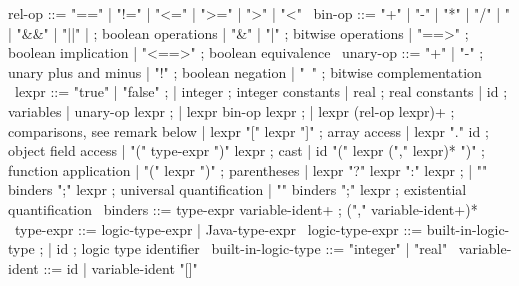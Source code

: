 \begin{syntax}
  rel-op ::= "==" | "!=" | "<=" | ">=" | ">" | "<"
       \
  bin-op ::= "+" | "-" | "*" | "/" | "%
       | "&&" | "||" |   ; boolean operations
       | "&" | "|" ; bitwise operations
       | "==>" ; boolean implication
       | "<==>" ; boolean equivalence
       \
  unary-op ::= "+" | "-" ; unary plus and minus
       | "!" ; boolean negation
       | "~" ;  bitwise complementation
       \
  lexpr ::= "true" | "false" ;
       | integer ; integer constants
       | real ; real constants
       | id ; variables
       | unary-op lexpr ;
       | lexpr bin-op lexpr ;
       | lexpr (rel-op lexpr)+ ; comparisons, see remark below
       | lexpr "[" lexpr "]" ; array access
       | lexpr "." id  ; object field access
       | "(" type-expr ")" lexpr  ; cast
       | id "(" lexpr ("," lexpr)* ")" ; function application
       | "(" lexpr ")" ; parentheses
       | lexpr "?" lexpr ":" lexpr ;
       | "\forall" binders ";" lexpr ; universal quantification
       | "\exists" binders ";" lexpr ; existential quantification
       \
  binders ::= type-expr variable-ident+ ;
  ("," variable-ident+)*
  \
  type-expr ::= logic-type-expr | Java-type-expr
  \
  logic-type-expr ::= built-in-logic-type ;
  | id ; logic type identifier
  \
  built-in-logic-type ::= "integer" | "real" 
  \
  variable-ident ::= id 
  | variable-ident "[]"
\end{syntax}

